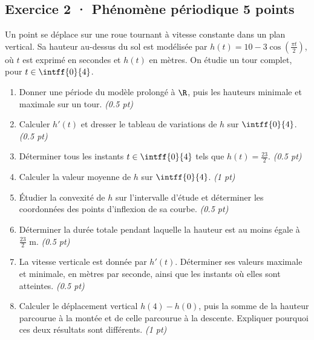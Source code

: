 \subsection*{Exercice 2 · Phénomène périodique \hfill 5 points}Un point se déplace sur une roue tournant à vitesse constante dans un plan vertical. Sa hauteur au-dessus du sol est modélisée par $h(t)=10-3\cos\left(\frac{\pi t}{2}\right)$, où $t$ est exprimé en secondes et $h(t)$ en mètres. On étudie un tour complet, pour $t\in\intff{0}{4}$.

\begin{enumerate}

\item Donner une période du modèle prolongé à $\R$, puis les hauteurs minimale et maximale sur un tour. \hfill\textit{(\num{0,5} pt)}

\item Calculer $h'(t)$ et dresser le tableau de variations de $h$ sur $\intff{0}{4}$. \hfill\textit{(\num{0,5} pt)}

\item Déterminer tous les instants $t\in\intff{0}{4}$ tels que $h(t)=\frac{23}{2}$. \hfill\textit{(\num{0,5} pt)}

\item Calculer la valeur moyenne de $h$ sur $\intff{0}{4}$. \hfill\textit{(1 pt)}

\item Étudier la convexité de $h$ sur l'intervalle d'étude et déterminer les coordonnées des points d'inflexion de sa courbe. \hfill\textit{(\num{0,5} pt)}

\item Déterminer la durée totale pendant laquelle la hauteur est au moins égale à $\frac{23}{2}$ m. \hfill\textit{(\num{0,5} pt)}

\item La vitesse verticale est donnée par $h'(t)$. Déterminer ses valeurs maximale et minimale, en mètres par seconde, ainsi que les instants où elles sont atteintes. \hfill\textit{(\num{0,5} pt)}

\item Calculer le déplacement vertical $h(4)-h(0)$, puis la somme de la hauteur parcourue à la montée et de celle parcourue à la descente. Expliquer pourquoi ces deux résultats sont différents. \hfill\textit{(1 pt)}

\end{enumerate}

\mxnewpage{}

